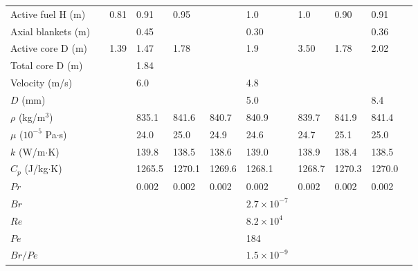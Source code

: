 \documentclass[10pt]{article}
\numberwithin{equation}{section} %
\begin{document}
\begin{table}
\begin{table}[H]
\begin{tabular}{l l l l l l l l l l l}
 Active fuel H (m)					& 			& 0.81			& 0.91		& 0.95		&			& 1.0			& 1.0				& 0.90		& 0.91\\
 Axial blankets (m)					&			&				& 0.45		&			&			& 0.30		&				&			& 0.36\\
 Active core D (m)					& 			& 1.39			& 1.47		& 1.78		&			& 1.9			& 3.50			& 1.78		& 2.02\\
 Total core D (m)					&			&				& 1.84\\
 \hdashline
 Velocity (m/s)						& 			& 				& 6.0			&			&			& 4.8\\
  \(D\) (mm)						&			& 				&			&			&			& 5.0			&				&			& 8.4\\
 \(\rho\) (kg/\(\textrm{m}^3\))			&			& 				& 835.1		& 841.6		& 840.7		& 840.9		& 839.7			& 841.9		& 841.4\\
 \(\mu\) (\(10^{-5}\) Pa\(\cdot\)s)			& 			& 				& 24.0		& 25.0		& 24.9		& 24.6		& 24.7			& 25.1		& 25.0\\
 \(k\) (W/m\(\cdot\)K)					& 			&	 			& 139.8		& 138.5		& 138.6		& 139.0		& 138.9			& 138.4		& 138.5\\
 \(C_p\) (J/kg\(\cdot\)K)				& 			& 				& 1265.5		& 1270.1		& 1269.6		& 1268.1		& 1268.7			& 1270.3		& 1270.0\\
 \hdashline
 \(Pr\)							& 			& 				& 0.002		& 0.002		& 0.002		& 0.002		& 0.002			& 0.002		& 0.002\\
 \(Br\)							&			& 				&			&			&			& \(2.7\times10^{-7}\)\\
 \(Re\)							&			& 				&			&			&			& \(8.2\times10^{4}\)\\
 \(Pe\)							&			& 				&			&			&			& 184\\
 \(Br/Pe\)							& 			& 				&			&			&			& \(1.5\times10^{-9}\)\\
\hline
\end{tabular}
\label{table:DemonstrationSodiumReactors}
\end{table}
\end{table}
\end{document}
